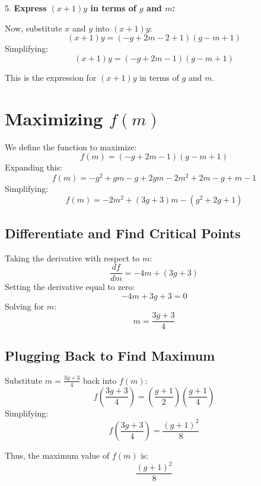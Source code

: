 \documentclass[11pt]{article}
\begin{document}
5. \textbf{Express \((x + 1)y\) in terms of \(g\) and \(m\):}

   Now, substitute \(x\) and \(y\) into \((x + 1)y\):
   \[
   (x + 1)y = \left(-g + 2m - 2 + 1\right)(g - m + 1)
   \]
   Simplifying:
   \[
   (x + 1)y = (-g + 2m - 1)(g - m + 1)
   \]

This is the expression for \((x + 1)y\) in terms of \(g\) and \(m\).

\section*{Maximizing \( f(m) \)}

We define the function to maximize:
\[
f(m) = (-g + 2m - 1)(g - m + 1)
\]
Expanding this:
\[
f(m) = -g^2 + gm - g + 2gm - 2m^2 + 2m - g + m - 1
\]
Simplifying:
\[
f(m) = -2m^2 + (3g + 3)m - (g^2 + 2g + 1)
\]

\subsection*{Differentiate and Find Critical Points}

Taking the derivative with respect to \(m\):
\[
\frac{df}{dm} = -4m + (3g + 3)
\]
Setting the derivative equal to zero:
\[
-4m + 3g + 3 = 0
\]
Solving for \(m\):
\[
m = \frac{3g + 3}{4}
\]

\subsection*{Plugging Back to Find Maximum}

Substitute \(m = \frac{3g + 3}{4}\) back into \(f(m)\):
\[
f\left(\frac{3g + 3}{4}\right) = \left(\frac{g + 1}{2}\right)\left(\frac{g + 1}{4}\right)
\]
Simplifying:
\[
f\left(\frac{3g + 3}{4}\right) = \frac{(g + 1)^2}{8}
\]

Thus, the maximum value of \(f(m)\) is:
\[
\boxed{\frac{(g + 1)^2}{8}}
\]
\end{document}
